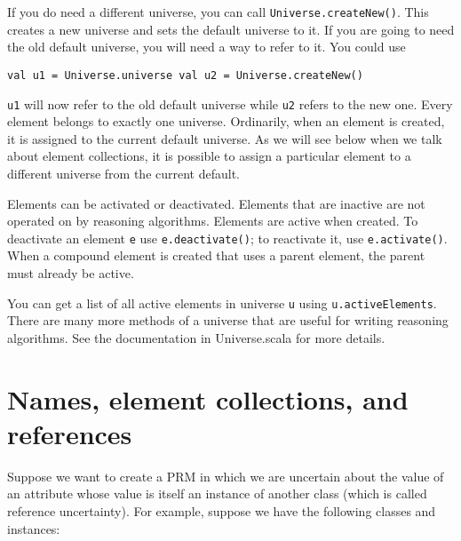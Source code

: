 If you do need a different universe, you can call \texttt{Universe.create\-New()}. This creates a new universe and sets the default universe to it. If you are going to need the old default universe, you will need a way to refer to it. You could use

\begin{flushleft}
\texttt{val u1 = Universe.universe
\newline val u2 = Universe.createNew()}
\end{flushleft}

\texttt{u1} will now refer to the old default universe while \texttt{u2} refers to the new one. Every element belongs to exactly one universe. Ordinarily, when an element is created, it is assigned to the current default universe. As we will see below when we talk about element collections, it is possible to assign a particular element to a different universe from the current default.

Elements can be activated or deactivated. Elements that are inactive are not operated on by reasoning algorithms. Elements are active when created. To deactivate an element \texttt{e} use \texttt{e.deactivate()}; to reactivate it, use \texttt{e.activate()}. When a compound element is created that uses a parent element, the parent must already be active.

You can get a list of all active elements in universe \texttt{u} using \texttt{u.active\-Elements}. There are many more methods of a universe that are useful for writing reasoning algorithms. See the documentation in Universe.scala for more details.

\section{Names, element collections, and references}

Suppose we want to create a PRM in which we are uncertain about the value of an attribute whose value is itself an instance of another class (which is called reference uncertainty). For example, suppose we have the following classes and instances:

